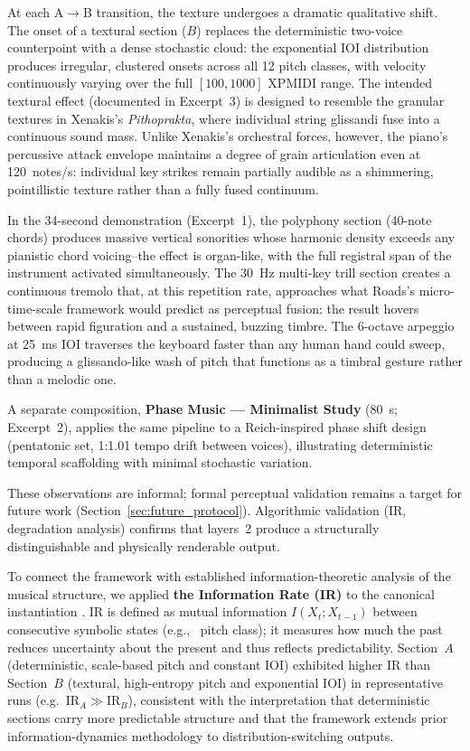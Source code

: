 \documentclass[a4paper]{article}
\theoremstyle{definition}
\theoremstyle{remark}
\begin{document}
At each A$\rightarrow$B transition, the texture undergoes a dramatic qualitative shift. The onset of a textural section ($B$) replaces the deterministic two-voice counterpoint with a dense stochastic cloud: the exponential IOI distribution produces irregular, clustered onsets across all 12 pitch classes, with velocity continuously varying over the full $[100, 1000]$ XPMIDI range. The intended textural effect (documented in Excerpt~3) is designed to resemble the granular textures in Xenakis's \emph{Pithoprakta}, where individual string glissandi fuse into a continuous sound mass. Unlike Xenakis's orchestral forces, however, the piano's percussive attack envelope maintains a degree of grain articulation even at 120~notes/s: individual key strikes remain partially audible as a shimmering, pointillistic texture rather than a fully fused continuum.

In the 34-second demonstration (Excerpt~1), the polyphony section (40-note chords) produces massive vertical sonorities whose harmonic density exceeds any pianistic chord voicing--the effect is organ-like, with the full registral span of the instrument activated simultaneously. The 30~Hz multi-key trill section creates a continuous tremolo that, at this repetition rate, approaches what Roads's micro-time-scale framework would predict as perceptual fusion: the result hovers between rapid figuration and a sustained, buzzing timbre. The 6-octave arpeggio at 25~ms IOI traverses the keyboard faster than any human hand could sweep, producing a glissando-like wash of pitch that functions as a timbral gesture rather than a melodic one.

A separate composition, \textbf{Phase Music — Minimalist Study} (80~s; Excerpt~2), applies the same pipeline to a Reich-inspired phase shift design (pentatonic set, 1:1.01 tempo drift between voices), illustrating deterministic temporal scaffolding with minimal stochastic variation.

These observations are informal; formal perceptual validation remains a target for future work (Section~\ref{sec:future_protocol}). Algorithmic validation (IR, degradation analysis) confirms that layers~2 produce a structurally distinguishable and physically renderable output.

To connect the framework with established information-theoretic analysis of the musical structure, we applied \textbf{the Information Rate (IR)} to the canonical instantiation \citep{abdallah2009information}. IR is defined as mutual information $I(X_t; X_{t-1})$ between consecutive symbolic states (e.g., \ pitch class); it measures how much the past reduces uncertainty about the present and thus reflects predictability. Section~$A$ (deterministic, scale-based pitch and constant IOI) exhibited higher IR than Section~$B$ (textural, high-entropy pitch and exponential IOI) in representative runs (e.g.\ IR$_A \gg \text{IR}_B$), consistent with the interpretation that deterministic sections carry more predictable structure and that the framework extends prior information-dynamics methodology to distribution-switching outputs. 
\end{document}
